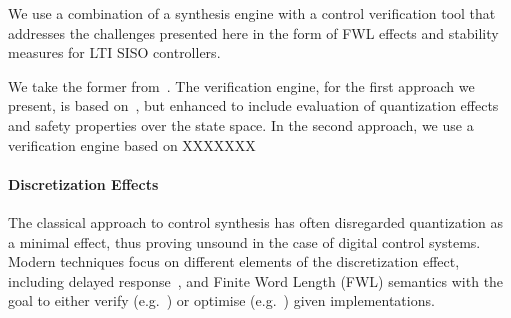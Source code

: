 \documentclass[runningheads,a4paper]{llncs}
\begin{document}
We use a combination of a synthesis engine with a control
verification tool that addresses the challenges presented here in the
form of FWL effects and stability measures for LTI SISO controllers.

We take the former from~\cite{DBLP:conf/lpar/DavidKL15}. The verification engine, for
the first approach we present, is 
based on~\cite{Monteiro16}, but 
enhanced to include evaluation of quantization effects and safety properties
over the state space. In the second approach, we use a verification engine
based on XXXXXXX




\paragraph{Discretization Effects}

The classical approach to control synthesis has often disregarded
quantization as a minimal effect, thus proving unsound in the case of digital control systems.
Modern techniques focus on different elements of the discretization effect, including delayed
response~\cite{Duggirala2015}, and Finite Word Length (FWL) semantics with
the goal to either verify (e.g.~\cite{daes20161}) or optimise
(e.g.~\cite{oudjida2014design}) given implementations.
\end{document}
